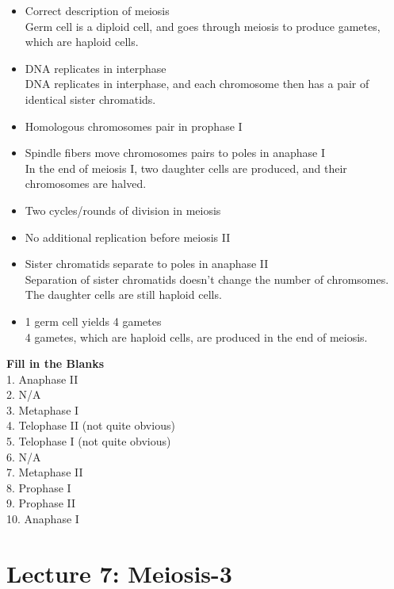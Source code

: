 \documentclass[
]{book}
\begin{document}
\begin{itemize}
\item
  Correct description of meiosis\\
  Germ cell is a diploid cell, and goes through meiosis to produce gametes, which are haploid cells.\\
\item
  DNA replicates in interphase\\
  DNA replicates in interphase, and each chromosome then has a pair of identical sister chromatids.\\
\item
  Homologous chromosomes pair in prophase I\\
\item
  Spindle fibers move chromosomes pairs to poles in anaphase I\\
  In the end of meiosis I, two daughter cells are produced, and their chromosomes are halved.
\item
  Two cycles/rounds of division in meiosis\\
\item
  No additional replication before meiosis II\\
\item
  Sister chromatids separate to poles in anaphase II\\
  Separation of sister chromatids doesn't change the number of chromsomes. The daughter cells are still haploid cells.
\item
  1 germ cell yields 4 gametes\\
  4 gametes, which are haploid cells, are produced in the end of meiosis.
\end{itemize}

\textbf{Fill in the Blanks}\\
1. Anaphase II\\
2. N/A\\
3. Metaphase I\\
4. Telophase II (not quite obvious)\\
5. Telophase I (not quite obvious)\\
6. N/A\\
7. Metaphase II\\
8. Prophase I\\
9. Prophase II\\
10. Anaphase I

\hypertarget{lecture-7-meiosis-3}{%
\section{Lecture 7: Meiosis-3}\label{lecture-7-meiosis-3}}
\end{document}
